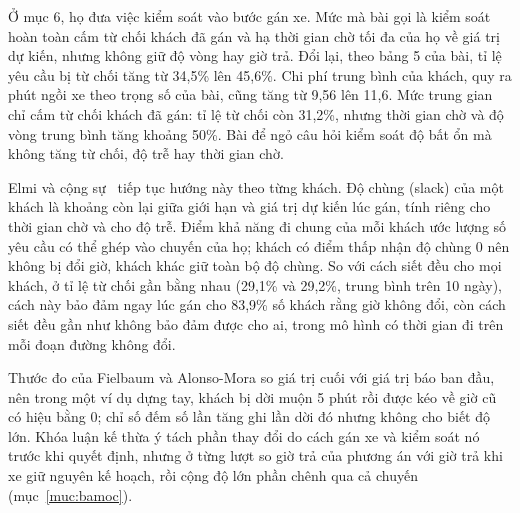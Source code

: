 Ở mục 6, họ đưa việc kiểm soát vào bước gán xe. Mức mà bài gọi là kiểm soát hoàn toàn cấm từ chối khách đã gán và
hạ thời gian chờ tối đa của họ về giá trị dự kiến, nhưng không giữ độ vòng hay giờ trả. Đổi lại, theo bảng 5 của bài,
tỉ lệ yêu cầu bị từ chối tăng từ 34,5\% lên 45,6\%. Chi phí trung bình của khách, quy ra phút ngồi xe theo trọng số của
bài, cũng tăng từ 9,56 lên 11,6. Mức trung gian chỉ cấm từ chối khách đã gán: tỉ lệ từ chối còn 31,2\%, nhưng
thời gian chờ và độ vòng trung bình tăng khoảng 50\%. Bài để ngỏ câu hỏi kiểm soát độ bất ổn mà không tăng từ chối,
độ trễ hay thời gian chờ.

Elmi và cộng sự~\cite{elmi2026} tiếp tục hướng này theo từng khách. Độ chùng (slack) của một khách là khoảng còn lại
giữa giới hạn và giá trị dự kiến lúc gán, tính riêng cho thời gian chờ và cho độ trễ. Điểm khả năng đi chung của mỗi
khách ước lượng số yêu cầu có thể ghép vào chuyến của họ; khách có điểm thấp nhận độ chùng 0 nên không bị đổi giờ,
khách khác giữ toàn bộ độ chùng. So với cách siết đều cho mọi khách, ở tỉ lệ từ chối gần bằng nhau (29,1\% và 29,2\%,
trung bình trên 10 ngày), cách này bảo đảm ngay lúc gán cho 83,9\% số khách rằng giờ không đổi, còn cách siết đều gần
như không bảo đảm được cho ai, trong mô hình có thời gian đi trên mỗi đoạn đường không đổi.

Thước đo của Fielbaum và Alonso-Mora so giá trị cuối với giá trị báo ban đầu, nên trong một ví dụ dựng tay, khách bị
dời muộn 5 phút rồi được kéo về giờ cũ có hiệu bằng 0; chỉ số đếm số lần tăng ghi lần dời đó nhưng không cho biết độ
lớn. Khóa luận kế thừa ý tách phần thay đổi do cách gán xe và kiểm soát nó trước khi quyết định, nhưng ở từng lượt so
giờ trả của phương án với giờ trả khi xe giữ nguyên kế hoạch, rồi cộng độ lớn phần chênh qua cả chuyến
(mục~\ref{muc:bamoc}).

